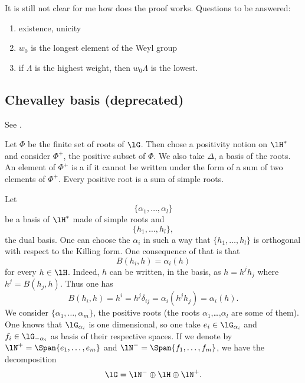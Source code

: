 \begin{probleme}
    It is still not clear for me how does the proof works. Questions to be answered:
    \begin{enumerate}
        \item
            existence, unicity
        \item
            \( w_0\) is the longest element of the Weyl group
        \item
            if \( \Lambda\) is the highest weight, then \( w_0\Lambda\) is the lowest.
    \end{enumerate}
\end{probleme}

                    \subsection{Chevalley basis (deprecated)}
See \cite{SSLA_Modave2005}.

Let $\Phi$ be the finite set of roots of $\lG$. Then chose a positivity notion on $\lH^*$ and consider $\Phi^+$, the positive subset of $\Phi$. We also take $\Delta$, a basis of the roots. An element of $\Phi^+$ is a  if it cannot be written under the form of a sum of two elements of $\Phi^+$. Every positive root is a sum of simple roots.

Let
\begin{equation}
    \{ \alpha_1,\ldots,\alpha_l \}
\end{equation}
be a basis of $\lH^*$ made of simple roots and
\begin{equation}
    \{ h_1,\ldots,h_l \},
\end{equation}
the dual basis. One can choose the $\alpha_i$ in such a way that $\{ h_1,\ldots,h_l \}$ is orthogonal with respect to the Killing form. One consequence of that is that
\begin{equation}            \label{EqBhihalphaih}
    B(h_i,h)=\alpha_i(h)
\end{equation}
for every $h\in\lH$. Indeed, $h$ can be written, in the basis, as $h=h^jh_j$ where $h^j=B(h_j,h)$. Thus one has
\begin{equation}
    B(h_i,h)=h^i=h^j\delta_{ij}=\alpha_i(h^jh_j)=\alpha_i(h).
\end{equation}
We consider $\{ \alpha_1,\ldots,\alpha_m \}$, the positive roots (the roots $\alpha_1$,\ldots,$\alpha_l$ are some of them). One knows that $\lG_{\alpha_i}$ is one dimensional, so one take $e_i\in\lG_{\alpha_i}$ and $f_i\in\lG_{-\alpha_i}$ as basis of their respective spaces. If we denote by $\lN^+=\Span\{ e_1,\ldots, e_m \}$ and $\lN^-=\Span\{ f_1,\ldots,f_m \}$, we have the decomposition
\begin{equation}
    \lG=\lN^-\oplus\lH\oplus\lN^+.
\end{equation}



